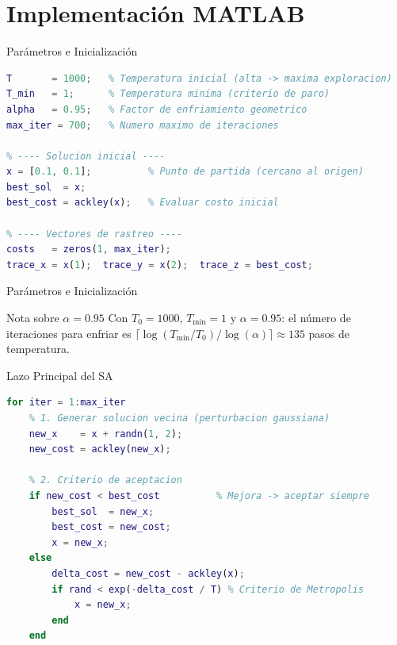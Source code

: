\documentclass[aspectratio=169,xcolor=dvipsnames]{beamer}
\begin{document}
\section{Implementación MATLAB}

\begin{frame}[fragile]{Parámetros e Inicialización}
\begin{lstlisting}[language=Matlab, style=MATLABStyle]
% ---- Parametros del algoritmo ----
T       = 1000;   % Temperatura inicial (alta -> maxima exploracion)
T_min   = 1;      % Temperatura minima (criterio de paro)
alpha   = 0.95;   % Factor de enfriamiento geometrico
max_iter = 700;   % Numero maximo de iteraciones

% ---- Solucion inicial ----
x = [0.1, 0.1];          % Punto de partida (cercano al origen)
best_sol  = x;
best_cost = ackley(x);   % Evaluar costo inicial

% ---- Vectores de rastreo ----
costs   = zeros(1, max_iter);
trace_x = x(1);  trace_y = x(2);  trace_z = best_cost;
\end{lstlisting}
\end{frame}
\begin{frame}[fragile]{Parámetros e Inicialización}

\begin{block}{Nota sobre $\alpha = 0.95$}
    Con $T_0=1000$, $T_{\min}=1$ y $\alpha=0.95$: el número de iteraciones para enfriar es $\lceil \log(T_{\min}/T_0)/\log(\alpha) \rceil \approx 135$ pasos de temperatura.
\end{block}
\end{frame}

\begin{frame}[fragile]{Lazo Principal del SA}
\begin{lstlisting}[language=Matlab, style=MATLABStyle]
for iter = 1:max_iter
    % 1. Generar solucion vecina (perturbacion gaussiana)
    new_x    = x + randn(1, 2);
    new_cost = ackley(new_x);

    % 2. Criterio de aceptacion
    if new_cost < best_cost          % Mejora -> aceptar siempre
        best_sol  = new_x;
        best_cost = new_cost;
        x = new_x;
    else
        delta_cost = new_cost - ackley(x);
        if rand < exp(-delta_cost / T) % Criterio de Metropolis
            x = new_x;
        end
    end

\end{lstlisting}
\end{frame}
\end{document}

